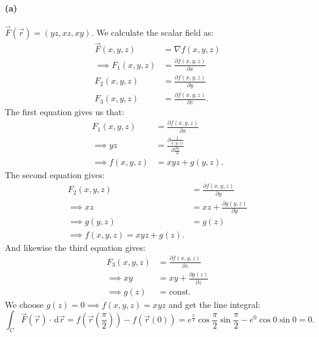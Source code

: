 \paragraph{(a)} $\Vec{F}(\Vec{r}) = \left( yz, xz, xy \right)$.
\bigbreak
We calculate the scalar field as:
\begin{align*}
  \Vec{F}(x,y,z) &= \nabla f(x,y,z) \\
  \implies F_1(x,y,z) &= \frac{\partial f(x,y,z)}{\partial x} \\
  F_2(x,y,z) &= \frac{\partial f(x,y,z)}{\partial y} \\
  F_3(x,y,z) &= \frac{\partial f(x,y,z)}{\partial z}
.\end{align*}
The first equation gives us that:
\begin{align*}
  F_1 (x,y,z) &= \frac{\partial f(x,y,z)}{\partial x} \\
  \implies yz &= \frac{\partial \frac{f}{x,y,z)}}{\partial \frac{\partial x}{\partial }} \\
  \implies f(x,y,z) &= xyz + g(y,z)
.\end{align*}
The second equation gives:
\begin{align*}
  F_2(x,y,z) &= \frac{\partial f(x,y,z)}{\partial y} \\
  \implies xz &= xz + \frac{\partial g(y,z)}{\partial y} \\
\implies g(y,z) &= g(z) \\
\implies f(x,y,z) = xyz + g(z)
.\end{align*}
And likewise the third equation gives:
\begin{align*}
  F_3(x,y,z) &= \frac{\partial f(x,y,z)}{\partial z} \\
  \implies xy &= xy + \frac{\partial g(z)}{\partial z} \\
  \implies g(z) &= \mathrm{const}
.\end{align*}
We choose $g(z) = 0 \implies f(x,y,z) = xyz$ and get the line integral:
\[ 
\int_{C} \Vec{F} (\Vec{r})\cdot \, \mathrm{d}\Vec{r} = f \left( \Vec{r} \left( \frac{\pi}{2} \right) \right) - f(\Vec{r}(0)) = e^{\frac{\pi}{2}} \cos \frac{\pi}{2} \sin \frac{\pi}{2} - e^{0} \cos 0 \sin 0 = 0
.\]



